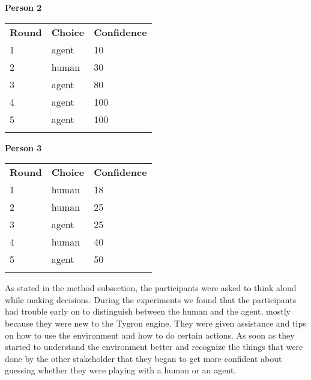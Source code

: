 \textbf{Person 2}
\begin{tabular}{lll}
\textbf{Round} & \textbf{Choice}  & \textbf{Confidence}\\ 
1 & agent  & 10        \\
2 & human  & 30         \\
3 & agent  & 80         \\
4 & agent  & 100         \\
5 & agent  & 100       \\\\
\end{tabular}

\textbf{Person 3}
\begin{tabular}{lll}
\textbf{Round} & \textbf{Choice}  & \textbf{Confidence}\\ 
1 & human  & 18         \\
2 & human  & 25         \\
3 & agent  & 25         \\
4 & human  & 40         \\
5 & agent  & 50        \\\\
\end{tabular}

As stated in the method subsection, the participants were asked to think aloud while making decisions. During the experiments we found that the participants had trouble early on to distinguish between the human and the agent, mostly because they were new to the Tygron engine. They were given assistance and tips on how to use the environment and how to do certain actions. As soon as they started to understand the environment better and recognize the things that were done by the other stakeholder that they began to get more confident about guessing whether they were playing with a human or an agent.

